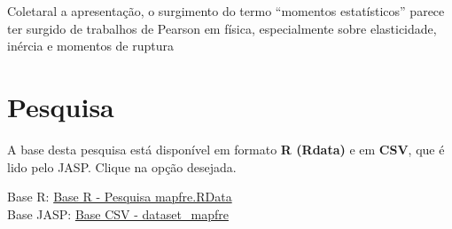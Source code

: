 \documentclass[
]{book}
\newenvironment{Shaded}{\begin{snugshade}}{\end{snugshade}}
\newcommand{\CommentTok}[1]{\textcolor[rgb]{0.56,0.35,0.01}{\textit{#1}}}
\newcommand{\DecValTok}[1]{\textcolor[rgb]{0.00,0.00,0.81}{#1}}
\newcommand{\KeywordTok}[1]{\textcolor[rgb]{0.13,0.29,0.53}{\textbf{#1}}}
\newcommand{\NormalTok}[1]{#1}
\newcommand{\OperatorTok}[1]{\textcolor[rgb]{0.81,0.36,0.00}{\textbf{#1}}}
\newcommand{\StringTok}[1]{\textcolor[rgb]{0.31,0.60,0.02}{#1}}
\begin{document}
\begin{Shaded}
\end{Shaded}

Coletaral a apresentação, o surgimento do termo ``momentos estatísticos'' parece ter surgido de trabalhos de Pearson em física, especialmente sobre elasticidade, inércia e momentos de ruptura \citep{David1998}

\hypertarget{pesquisa}{%
\section{Pesquisa}\label{pesquisa}}

\begin{base}

A base desta pesquisa está disponível em formato \textbf{R (Rdata)} e em \textbf{CSV}, que é lido pelo JASP. Clique na opção desejada.

Base R: \href{https://github.com/anovabr/mqt/raw/master/bases/Base\%20R\%20-\%20Pesquisa\%20mapfre.RData}{Base R - Pesquisa mapfre.RData}\\
Base JASP: \href{https://github.com/anovabr/mqt/raw/master/bases/bases_csv_jasp.zip}{Base CSV - dataset\_mapfre}

\end{base}
\end{document}
